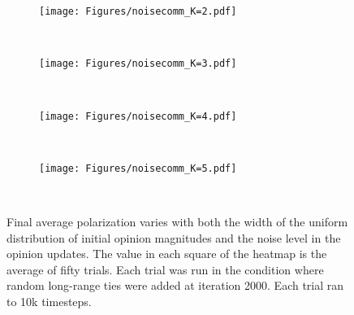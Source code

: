 \begin{figure}[t!]
  \centering
      \begin{subfigure}[t]{0.49\textwidth}
          \centering
          \texttt{[image: Figures/noisecomm\_K=2.pdf]}
      \end{subfigure}
      ~
      \begin{subfigure}[t]{0.49\textwidth}
          \centering
          \texttt{[image: Figures/noisecomm\_K=3.pdf]}
      \end{subfigure} \\
      \begin{subfigure}[t]{0.49\textwidth}
          \centering
          \texttt{[image: Figures/noisecomm\_K=4.pdf]}
      \end{subfigure}
      ~
      \begin{subfigure}[t]{0.49\textwidth}
          \centering
          \texttt{[image: Figures/noisecomm\_K=5.pdf]}
      \end{subfigure} \\
  \caption{Final average polarization varies with both the width of the
    uniform distribution of initial opinion magnitudes and the noise level in
    the opinion updates. The value in each square of the heatmap is the average of
    fifty trials. Each trial was run in the condition where random long-range
    ties were added at iteration 2000. Each trial ran to 10k timesteps. 
  }
  \label{fig:heatmaps}
\end{figure}



